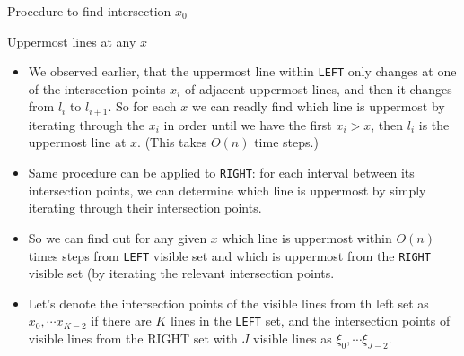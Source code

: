 \documentclass[ignorenonframetext,]{beamer}
\begin{document}
\begin{frame}{Procedure to find intersection $x_0$}

  \begin{block}{Uppermost lines at any $x$}
    \begin{itemize}
    \item We observed earlier, that the uppermost line within \texttt{LEFT}
      only changes at one of the intersection points $x_i$ of adjacent uppermost
      lines, and then it changes from $l_i$ to $l_{i+1}$. 
      So for each $x$ we can readly find which line is uppermost by
      iterating through the $x_i$ in order until we have the first $x_i
      > x$, then $l_i$ is the uppermost line at $x$. (This takes $O(n)$ time steps.)
    \item Same procedure can be applied to \texttt{RIGHT}: for each
      interval between its intersection points, we can determine which
      line is uppermost by simply iterating through their intersection
      points.
    \item So we can find out for any given $x$ which line is uppermost
      within $O(n)$ times steps from \texttt{LEFT} visible set and which is
      uppermost from the \texttt{RIGHT} visible set (by iterating the
      relevant intersection points.
    \item Let's denote the intersection points of the visible lines from
      th left set as $x_0,\cdots x_{K-2}$ if there are $K$ lines in the
      \texttt{LEFT} set, and the intersection points of visible lines
      from the RIGHT set with $J$ visible lines as $\xi_0, \cdots
      \xi_{J-2}$.
    \end{itemize}
  \end{block}
\end{frame}  
\end{document}
